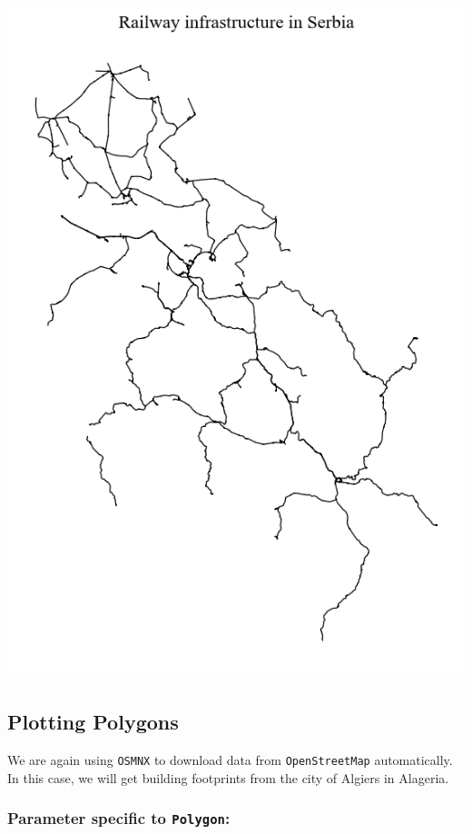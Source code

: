 \documentclass[
  letterpaper,
  DIV=11,
  numbers=noendperiod]{scrreprt}
\begin{document}
\includegraphics{labs/w02_maps_files/figure-pdf/cell-14-output-2.png}

\subsection{Plotting Polygons}\label{plotting-polygons}

We are again using \texttt{OSMNX} to download data from
\texttt{OpenStreetMap} automatically. In this case, we will get building
footprints from the city of Algiers in Alageria.

\subsubsection{\texorpdfstring{Parameter specific to
\texttt{Polygon}:}{Parameter specific to Polygon:}}\label{parameter-specific-to-polygon}
\end{document}
